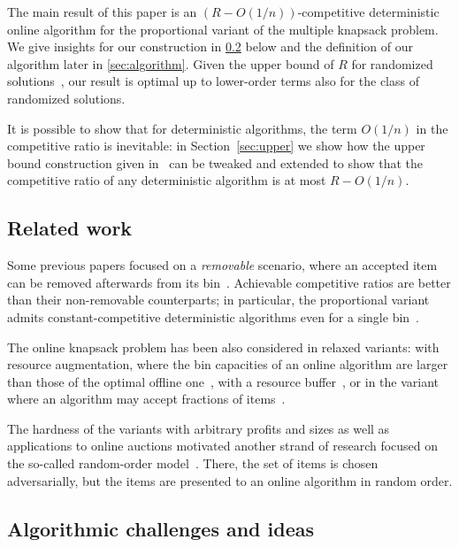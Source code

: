 \documentclass[a4paper,USenglish,cleveref]{lipics-v2019}
\newcommand{\R}{\ensuremath{R}}
\begin{document}
The main result of this paper is an $(\R-O(1/n))$-competitive deterministic
online algorithm for the proportional variant of the multiple knapsack problem.
We give insights for our construction in \cref{sec:idea} below and the
definition of our algorithm later in \cref{sec:algorithm}. Given the upper bound
of $\R$ for randomized solutions~\cite{CyJeSg16}, our result is optimal up to
lower-order terms also for the class of randomized solutions.

It is possible to show that for deterministic algorithms, 
the term $O(1/n)$ in the competitive 
ratio is inevitable: in Section~\ref{sec:upper} we show how the upper bound
construction given in~\cite{CyJeSg16} can be tweaked and extended to show that the
competitive ratio of any deterministic algorithm is at most $\R-O(1/n)$.



\subsection{Related work}

Some previous papers focused on a \emph{removable} scenario, where an accepted item can
be removed afterwards from its
bin~\cite{ABFLNE02,CyJeSg16,HaKaMa15,IwaTak02,IwaZha10}. Achievable competitive
ratios are better than their non-removable counterparts; in particular, the
proportional variant admits constant-competitive deterministic algorithms even
for a single bin~\cite{IwaTak02}.

The online knapsack problem has been also considered in relaxed variants: with
resource augmentation, where the bin capacities of an online algorithm are
larger than those of the optimal offline one~\cite{IwaZha10,NogSar05}, with a
resource buffer~\cite{HaKaMY19}, or in the variant where an algorithm may accept
fractions of items~\cite{NogSar05}.

The hardness of the variants with arbitrary profits and sizes as well as
applications to online auctions motivated another strand of research focused on
the so-called random-order model~\cite{AlKhLa19,BaImKK07,KeRaTV18,Vaze17}.
There, the set of items is chosen adversarially, but the items are presented to an
online algorithm in random order. 



\subsection{Algorithmic challenges and ideas}
\label{sec:idea}
\end{document}
